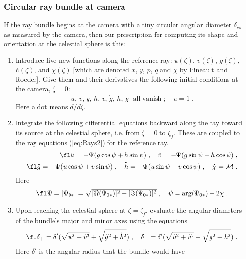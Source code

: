 \documentclass[12pt]{iopart}
\begin{document}
\subsubsection{Circular ray bundle at camera}
\label{subsec:CircAtCamera}

If the ray bundle begins at the camera with a tiny circular angular diameter
$\delta_{cs}$ as measured by the camera, then our prescription for computing
its shape and orientation at the celestial sphere is this:
\begin{enumerate}
\item
Introduce five new  functions along the reference ray: 
$u(\zeta)$, $v(\zeta)$, $g(\zeta)$, $h(\zeta)$, and $\chi(\zeta)$ 
[which are denoted $x$, $y$, $p$, $q$ and $\chi$ by Pineault and Roeder].  Give them and their
derivatives the following initial conditions at the camera, $\zeta=0$:
\begin{equation}
u, \, v, \, g, \, h, \, \dot v, \, \dot g, \, \dot h, \, \dot \chi \;\; \textrm{all vanish}\;; \quad
 \dot u = 1\;.
\end{equation}
Here a dot means $d/d\zeta$.
\item
Integrate the following differential equations backward along the ray toward its source
at the celestial sphere, i.e. from $\zeta=0$ to $\zeta_f$.  These are coupled
to the ray equations (\ref{eq:Rays2}) for the reference ray.
\begin{eqnarray}
\fl
\ddot u = - \Psi (g \cos\psi + h \sin\psi)\;, \quad
\ddot v = - \Psi(g\sin\psi-h \cos\psi)\;,\nonumber \\
\fl
\ddot g = - \Psi(u\cos\psi + v \sin\psi)\;, \quad
\ddot h = - \Psi(u\sin\psi - v\cos\psi)\;, \quad
\dot \chi = \mathcal M\;.
\label{eq:BundleEvolution}
\end{eqnarray}
Here 
\begin{equation}
\fl
\Psi = | \Psi_{0*} | = \sqrt{[\Re(\Psi_{0*})]^2 + [\Im(\Psi_{0*})]^2}\;, \quad
\psi = \arg(\Psi_{0*} ) -2\chi \;.
\end{equation}
\item
Upon reaching the celestial sphere at $\zeta = \zeta_f$, evaluate the angular diameters of the
bundle's major and minor axes using the equations
\begin{equation}
\fl
\delta_+ = \delta' (\sqrt{\dot u^2+\dot v^2} + \sqrt{\dot g^2+\dot h^2})\;, \quad
\delta_- = \delta' (\sqrt{\dot u^2 +\dot v^2} - \sqrt{\dot g^2+\dot h^2})\;. 
\label{eq:deltapm}
\end{equation}
Here 
$\delta'$ is the angular radius that the bundle would have 

\end{enumerate}
\end{document}

